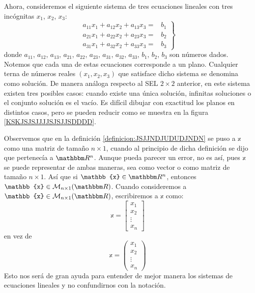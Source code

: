 Ahora, consideremos el siguiente sistema de tres ecuaciones lineales con tres incógnitas $x_1$, $x_2$, $x_3$:
$$\left. \begin{array}{rl}
    a_{11}x_1+a_{12}x_2+a_{13}x_3 = & \!\!\!\! b_1 \\ 
    a_{21}x_1+a_{22}x_2+a_{23}x_3 = & \!\!\!\! b_2 \\ 
    a_{31}x_1+a_{32}x_2+a_{33}x_3 = & \!\!\!\! b_3
\end{array} \!\!\right\}$$
donde $a_{11}$, $a_{12}$, $a_{13}$, $a_{21}$, $a_{22}$, $a_{23}$, $a_{31}$, $a_{32}$, $a_{33}$, $b_1$, $b_2$, $b_3$ son números dados. Notemos que cada una de estas ecuaciones corresponde a un plano. Cualquier terna de números reales $(x_1, x_2, x_3)$ que satisface dicho sistema se denomina como solución. De manera análoga respecto al SEL $2 \times 2$ anterior, en este sistema existen tres posibles casos: cuando existe una única solución, infinitas soluciones o el conjunto solución es el vacío. Es difícil dibujar con exactitud los planos en distintos casos, pero se pueden reducir como se muestra en la figura \ref{KSKJSJSJJJJSJSJJSDDDD}.

\begin{observation}
    Observemos que en la definición \ref{definicion:JSJJNDJUDUDJNDN} se puso a $\mathbb{x}$ como una matriz de tamaño $n \times 1$, cuando al principio de dicha definición se dijo que pertenecía a $\RR[n]$. Aunque pueda parecer un error, no es así, pues $\mathbb{x}$ se puede representar de ambas maneras, sea como vector o como matriz de tamaño $n \times 1$. Así que si $\mathbb{x} \in \RR[n]$, entonces $\mathbb{x} \in \mathcal{M}_{n \times 1}(\RR)$. Cuando consideremos a $\mathbb{x} \in \mathcal{M}_{n \times 1}(\RR)$, escribiremos a $\mathbb{x}$ como:
    $$\mathbb{x} = \begin{bmatrix}
        x_1 \\
        x_2 \\
        \vdots \\
        x_n
    \end{bmatrix}$$
    en vez de
    $$\mathbb{x} = \begin{pmatrix}
        x_1 \\
        x_2 \\
        \vdots \\
        x_n
    \end{pmatrix}$$
    Esto nos será de gran ayuda para entender de mejor manera los sistemas de ecuaciones lineales y no confundirnos con la notación.
\end{observation}

